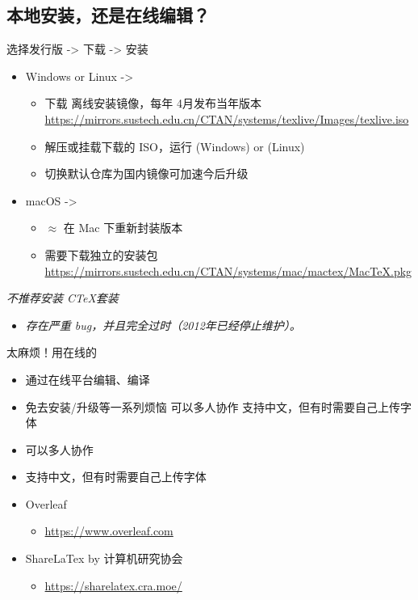 \subsection{本地安装，还是在线编辑？}

\begin{frame}[fragile]{选择发行版 -> 下载 -> 安装}
  \begin{itemize}
    \item Windows or Linux -> \texlive
      \begin{itemize}
        \item 下载 \texlive 离线安装镜像，每年 4月发布当年版本 \url{https://mirrors.sustech.edu.cn/CTAN/systems/texlive/Images/texlive.iso}
        \item 解压或挂载下载的 ISO，运行  (Windows) or  (Linux)
        \item 切换默认仓库为国内镜像可加速今后升级
      \end{itemize}
    \item macOS -> \mactex
      \begin{itemize}
        \item $\approx$ \texlive 在 Mac 下重新封装版本
        \item 需要下载独立的安装包 \url{https://mirrors.sustech.edu.cn/CTAN/systems/mac/mactex/MacTeX.pkg}
      \end{itemize}
\end{itemize}
    \emph{不推荐安装 C\TeX 套装}
    \begin{itemize}
        \item \emph{存在严重 bug，并且完全过时（2012年已经停止维护）。}
    \end{itemize}
\end{frame}

\begin{frame}[fragile]{太麻烦！用在线的}

    \begin{itemize}
        \item 通过在线平台编辑、编译
        \item 免去安装/升级等一系列烦恼 可以多人协作 支持中文，但有时需要自己上传字体
        \item 可以多人协作
        \item 支持中文，但有时需要自己上传字体
    \end{itemize}

    \begin{itemize}
      \item Overleaf
      \begin{itemize}
          \item \url{https://www.overleaf.com}
      \end{itemize}
      \item ShareLaTex by 计算机研究协会
      \begin{itemize}
        \item \url{https://sharelatex.cra.moe/}
    \end{itemize}
      \end{itemize}
  \end{frame}

